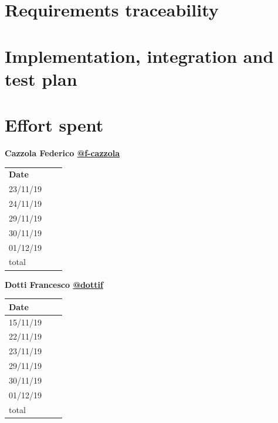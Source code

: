 \documentclass{article}
\begin{document}
\section{Requirements traceability}

\section{Implementation, integration and test plan}

\section{Effort spent}
	\begin{center}
		{\bf Cazzola Federico \href{https://github.com/f-cazzola}{@f-cazzola} }
		\vspace{2mm}

			\begin{tabular}{p{1.3cm}|p{1.8cm}|p{6.7cm}}
				\hline
				\bf Date & \bf \makebox[1.8cm][c]{Hours} & \bf \makebox[6.7cm][c]{Description} \\
				23/11/19 & \makebox[1.8cm][c]{2} & \makebox[6.7cm][c]{Architectural design}\\
				24/11/19 & \makebox[1.8cm][c]{3} & \makebox[6.7cm][c]{Architectural design}\\
				29/11/19 & \makebox[1.8cm][c]{2} & \makebox[6.7cm][c]{Architectural design}\\
				30/11/19 & \makebox[1.8cm][c]{6} & \makebox[6.7cm][c]{Architectural design}\\
				01/12/19 & \makebox[1.8cm][c]{2much} & \makebox[6.7cm][c]{Architectural design}\\
				\hline
				total    & \makebox[1.8cm][c]{13}
			\end{tabular}
	\end{center}
	\vspace{1cm}

	\begin{center}
		{\bf Dotti Francesco \href{https://github.com/dottif}{@dottif} }
		\vspace{2mm}

			\begin{tabular}{p{1.3cm}|p{1.8cm}|p{6.7cm}}
				\hline
				\bf Date & \bf \makebox[1.8cm][c]{Hours} & \bf \makebox[6.7cm][c]{Description} \\
				\hline
				15/11/19 & \makebox[1.8cm][c]{1} & \makebox[6.7cm][c]{Initial Structure}\\
				22/11/19 & \makebox[1.8cm][c]{1.5} & \makebox[6.7cm][c]{Introduction}\\
				23/11/19 & \makebox[1.8cm][c]{1.5} & \makebox[6.7cm][c]{Architectural design}\\
				29/11/19 & \makebox[1.8cm][c]{0.5} & \makebox[6.7cm][c]{Component view}\\
				30/11/19 & \makebox[1.8cm][c]{6.5}\makebox[6.7cm][c]{Component Deployment Runtime view}\\
				01/12/19 & \makebox[1.8cm][c]{2much} & \makebox[6.7cm][c]{Architectural design}\\
				\hline
				total    & \makebox[1.8cm][c]{11}
			\end{tabular}
	\end{center}
\end{document}
